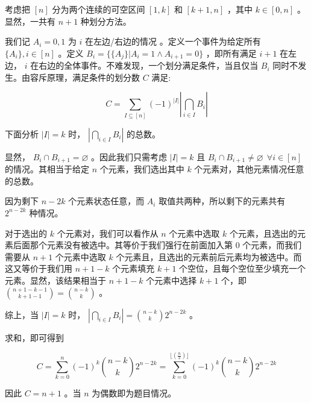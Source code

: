 \documentclass{article}
\begin{document}
考虑把 $[n]$ 分为两个连续的可空区间 $[1,k]$ 和 $[k+1,n]$ ，其中 $k\in[0,n]$ 。显然，一共有 $n + 1$ 种划分方法。

我们记 $A_i = 0,1$ 为 $i$ 在左边/右边的情况 。定义一个事件为给定所有 $\{A_i\} , i\in[n]$ 。定义 $B_i = \{\{A_j\} | A_i = 1 \wedge A_{i+1} = 0\}$ ，即所有满足 $i + 1$ 在左边， $i$ 在右边的全体事件。不难发现，一个划分满足条件，当且仅当 $B_i$ 同时不发生。由容斥原理，满足条件的划分数 $C$ 满足:

$$ C = \sum_{I \subseteq [n]} (-1)^{|I|} \left| \bigcap_{i \in I} B_i \right| $$

下面分析 $\left| I \right| = k$ 时， $\left| \bigcap_{i \in I} B_i \right|$ 的总数。

显然， $B_i \cap B_{i + 1} = \varnothing$ 。因此我们只需考虑 $\left| I \right| = k$ 且 $B_i \cap B_{i + 1} \ne \varnothing ~\ \forall i \in [n]$ 的情况。其相当于给定 $n$ 个元素，我们选出其中 $k$ 个元素对，其他元素情况任意的总数。

因为剩下 $n-2k$ 个元素状态任意，而 $A_i$ 取值共两种，所以剩下的元素共有 $2 ^ {n - 2k}$ 种情况。

对于选出的 $k$ 个元素对，我们可以看作从 $n$ 个元素中选取 $k$ 个元素，且选出的元素后面那个元素没有被选中。其等价于我们强行在前面加入第 $0$ 个元素，而我们需要从 $n+1$ 个元素中选取 $k$ 个元素且，且选出的元素前后元素均为被选中。而这又等价于我们用 $n + 1 - k $ 个元素填充 $k + 1$ 个空位，且每个空位至少填充一个元素。显然，该结果相当于 $n + 1 - k$ 个元素中选择 $k + 1$ 个，即 ${n + 1 - k - 1 \choose k + 1 - 1} = {n - k\choose k}$ 。

综上，当 $\left| I \right| = k$ 时， $\left| \bigcap_{i \in I} B_i \right| = {n - k\choose k} 2 ^ {n - 2k}$ 。

求和，即可得到

$$ C = \sum_{k = 0}^{n} (-1)^k {n - k\choose k} 2 ^ {n - 2k}
     = \sum_{k = 0}^{\lfloor(\frac{n}{2})\rfloor}  (-1)^k {n - k\choose k} 2 ^ {n - 2k}$$

因此 $C = n + 1 $ 。当 $n$ 为偶数即为题目情况。
\end{document}
